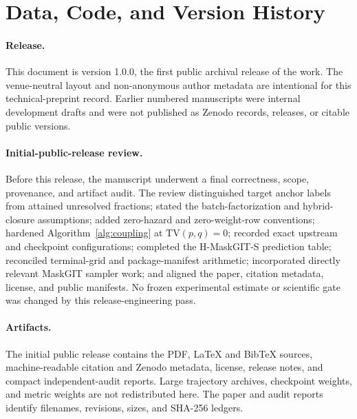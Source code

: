 \documentclass[11pt,a4paper]{article}
\theoremstyle{plain}
\theoremstyle{definition}
\theoremstyle{remark}
\newcommand{\TV}{\mathrm{TV}}
\begin{document}
\section*{Data, Code, and Version History}

\paragraph{Release.} This document is version 1.0.0, the first public
archival release of the work. The venue-neutral layout and non-anonymous author
metadata are intentional for this technical-preprint record. Earlier numbered
manuscripts were internal development drafts and were not published as Zenodo
records, releases, or citable public versions.

\paragraph{Initial-public-release review.} Before this release, the manuscript
underwent a final correctness, scope, provenance, and artifact audit. The review
distinguished target anchor labels from attained unresolved fractions; stated
the batch-factorization and hybrid-closure assumptions; added zero-hazard and
zero-weight-row conventions; hardened Algorithm~\ref{alg:coupling} at
$\TV(p,q)=0$; recorded exact upstream and checkpoint configurations; completed
the H-MaskGIT-S prediction table; reconciled terminal-grid and package-manifest
arithmetic; incorporated directly relevant MaskGIT sampler work; and aligned the
paper, citation metadata, license, and public manifests. No frozen experimental
estimate or scientific gate was changed by this release-engineering pass.

\paragraph{Artifacts.} The initial public release contains the PDF, LaTeX and
BibTeX sources, machine-readable citation and Zenodo metadata, license, release
notes, and compact independent-audit reports. Large trajectory archives,
checkpoint weights, and metric weights are not redistributed here. The paper and
audit reports identify filenames, revisions, sizes, and SHA-256 ledgers.

\appendix
\end{document}
